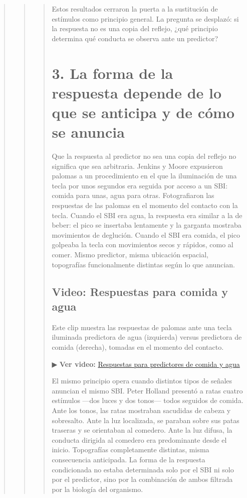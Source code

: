 \documentclass[
  letterpaper,
  DIV=11,
  numbers=noendperiod]{scrreprt}
\begin{document}
\begin{tcolorbox}[enhanced jigsaw, arc=.35mm, bottomrule=.15mm, breakable, colback=white, colframe=quarto-callout-note-color-frame, left=2mm, leftrule=.75mm, opacityback=0, rightrule=.15mm, toprule=.15mm]
\begin{quote}
\begin{quote}
\begin{quote}
Estos resultados cerraron la puerta a la sustitución de estímulos como
principio general. La pregunta se desplazó: si la respuesta no es una
copia del reflejo, ¿qué principio determina qué conducta se observa ante
un predictor?

\mbox{}%
\section{3. La forma de la respuesta depende de lo que se anticipa y de
cómo se
anuncia}\label{la-forma-de-la-respuesta-depende-de-lo-que-se-anticipa-y-de-cuxf3mo-se-anuncia}

Que la respuesta al predictor no sea una copia del reflejo no significa
que sea arbitraria. Jenkins y Moore expusieron palomas a un
procedimiento en el que la iluminación de una tecla por unos segundos
era seguida por acceso a un SBI: comida para unas, agua para otras.
Fotografiaron las respuestas de las palomas en el momento del contacto
con la tecla. Cuando el SBI era agua, la respuesta era similar a la de
beber: el pico se insertaba lentamente y la garganta mostraba
movimientos de deglución. Cuando el SBI era comida, el pico golpeaba la
tecla con movimientos secos y rápidos, como al comer. Mismo predictor,
misma ubicación espacial, topografías funcionalmente distintas según lo
que anuncian.

\mbox{}%
\subsection{\texorpdfstring{ Video: Respuestas para comida
y
agua}{ Video: Respuestas para comida y agua}}\label{b58fc729-690b-4000-b19f-365a4093b2ff7b7b3c20666120766964656f203e7d7d-video-respuestas-para-comida-y-agua}

Este clip muestra las respuestas de palomas ante una tecla iluminada
predictora de agua (izquierda) versus predictora de comida (derecha),
tomadas en el momento del contacto.

▶ \textbf{Ver video:}
\href{https://www.youtube.com/watch?v=50EmqiYC9Xw}{Respuestas para
predictores de comida y agua}

El mismo principio opera cuando distintos tipos de señales anuncian el
mismo SBI. Peter Holland presentó a ratas cuatro estímulos ---dos luces
y dos tonos--- todos seguidos de comida. Ante los tonos, las ratas
mostraban sacudidas de cabeza y sobresalto. Ante la luz localizada, se
paraban sobre sus patas traseras y se orientaban al comedero. Ante la
luz difusa, la conducta dirigida al comedero era predominante desde el
inicio. Topografías completamente distintas, misma consecuencia
anticipada. La forma de la respuesta condicionada no estaba determinada
solo por el SBI ni solo por el predictor, sino por la combinación de
ambos filtrada por la biología del organismo.


\end{quote}
\end{quote}
\end{quote}
\end{tcolorbox}
\end{document}
